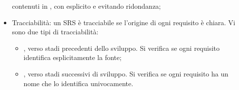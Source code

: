 \begin{itemize}
        contenuti in , con  esplicito e evitando ridondanza;
  \item Tracciabilità: un SRS è tracciabile se l'origine di ogni requisito è
        chiara. Vi sono due tipi di tracciabilità:
        \begin{itemize}
          \item {}, verso stadi precedenti
                dello sviluppo. Si verifica se ogni requisito identifica
                esplicitamente la fonte;
          \item {}, verso stadi successivi di
                sviluppo. Si verifica se ogni requisito ha un nome che lo
                identifica univocamente.
        \end{itemize}
\end{itemize}

